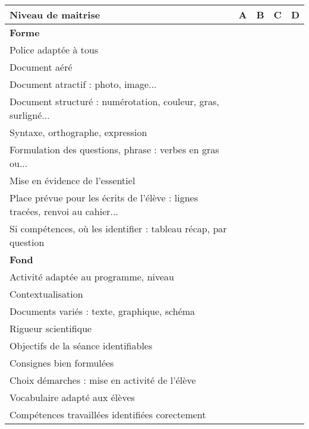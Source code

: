 \documentclass[12pt,a4paper]{article}
\begin{document}
\thispagestyle{empty}
\begin{center}
\begin{tabular}{|l|c|c|c|c|}
\hline 
\textbf{Niveau de maitrise} & A & B & C & D \\ 
\hline 
\textbf{Forme} &  &  &  &  \\ 
\hline 
Police adaptée à tous &  &  &  &  \\ 
\hline 
Document aéré &  &  &  &  \\ 
\hline 
Document atractif : photo, image... &  &  &  &  \\ 
\hline 
Document structuré : numérotation, couleur, gras, surligné... &  &  &  &  \\ 
\hline 
Syntaxe, orthographe, expression &  &  &  &  \\ 
\hline 
Formulation des questions,  phrase : verbes en gras ou... &  &  &  &  \\ 
\hline 
Mise en évidence de l'essentiel &  &  &  &  \\ 
\hline 
Place prévue pour les écrits de l'élève : lignes tracées, renvoi au cahier... &  &  &  &  \\ 
\hline 
Si compétences, où les identifier : tableau récap, par question &  &  &  &  \\ 
\hline 
\textbf{Fond} &  &  &  &  \\ 
\hline 
Activité adaptée au programme, niveau &  &  &  &  \\ 
\hline 
Contextualisation &  &  &  &  \\ 
\hline 
Documents variés : texte, graphique, schéma &  &  &  &  \\ 
\hline 
Rigueur scientifique &  &  &  &  \\ 
\hline 
Objectifs de la séance identifiables &  &  &  &  \\ 
\hline 
Consignes bien formulées &  &  &  &  \\ 
\hline 
Choix démarches : mise en activité de l'élève &  &  &  &  \\ 
\hline 
Vocabulaire adapté aux élèves &  &  &  &  \\ 
\hline 
Compétences travaillées identifiées corectement &  &  &  &  \\ 
\hline 
\end{tabular} 
\end{center}
\end{document}
